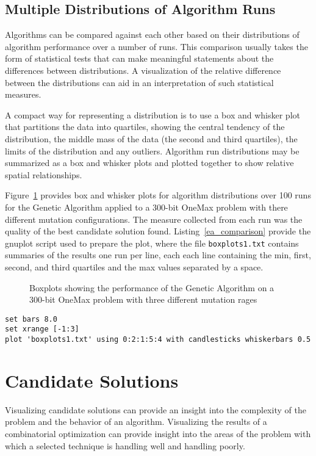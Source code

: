 \documentclass[a4paper, 11pt]{article}
\begin{document}
\subsection{Multiple Distributions of Algorithm Runs}
Algorithms can be compared against each other based on their distributions of algorithm performance over a number of runs. This comparison usually takes the form of statistical tests that can make meaningful statements about the differences between distributions. A visualization of the relative difference between the distributions can aid in an interpretation of such statistical measures. 

A compact way for representing a distribution is to use a box and whisker plot that partitions the data into quartiles, showing the central tendency of the distribution, the middle mass of the data (the second and third quartiles), the limits of the distribution and any outliers. Algorithm run distributions may be summarized as a box and whisker plots and plotted together to show relative spatial relationships.

Figure~\ref{plot:ga3} provides box and whisker plots for algorithm distributions over 100 runs for the Genetic Algorithm applied to a 300-bit OneMax problem with there different mutation configurations. The measure collected from each run was the quality of the best candidate solution found. 
Listing~\ref{ea_comparison} provide the gnuplot script used to prepare the plot, where the file \texttt{boxplots1.txt} contains summaries of the results one run per line, each each line containing the min, first, second, and third quartiles and the max values separated by a space.

\begin{figure}[htp]

\caption{Boxplots showing the performance of the Genetic Algorithm on a 300-bit OneMax problem with three different mutation rages}
\label{plot:ga3}
\end{figure}

\begin{lstlisting}[caption=Gnuplot script for creating a boxplot., label=ea_comparison]
set bars 8.0
set xrange [-1:3]
plot 'boxplots1.txt' using 0:2:1:5:4 with candlesticks whiskerbars 0.5
\end{lstlisting}

%
%
\section{Candidate Solutions}
Visualizing candidate solutions can provide an insight into the complexity of the problem and the behavior of an algorithm. Visualizing the results of a combinatorial optimization can provide insight into the areas of the problem with which a selected technique is handling well and handling poorly. 
\end{document}

